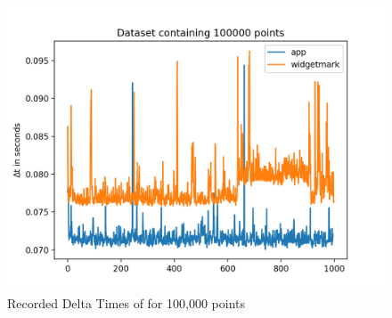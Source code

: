 \begin{figure}[h]
    \centering
    \includegraphics[width=12cm]{resources/img/evaluation/Eval_100000}
    \caption{
        Recorded Delta Times of for 100,000 points
    }
\end{figure}


\clearpage






